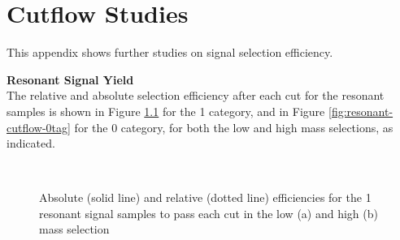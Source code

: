 \chapter{Cutflow Studies} \label{app:cutflows}

This appendix shows further studies on signal selection efficiency. 

\noindent \textbf{Resonant Signal Yield}\\
\indent The relative and absolute selection efficiency after each cut for the resonant samples is shown in Figure \ref{fig:resonant-cutflow-1tag} for the 1 \btag category, and in Figure \ref{fig:resonant-cutflow-0tag} for the 0 \btag category, for both the low and high mass selections, as indicated.



\begin{figure}[!b]
    \centering
    \\
    \caption[Absolute and relative efficiencies for the 1 \btag category, high mass selection]{Absolute (solid line) and relative (dotted line) efficiencies for the 1 \btag resonant signal samples to pass each cut in the low (a) and high (b) mass selection}
    \label{fig:resonant-cutflow-1tag}
  \end{figure}


